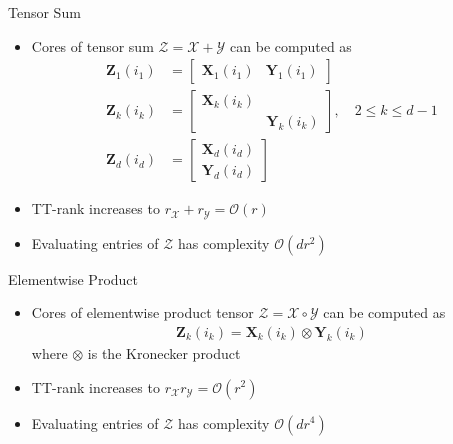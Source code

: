 \documentclass[aspectratio=169]{beamer}
\newcommand{\Mat}[1]{\mathbf{#1}}
\newcommand{\Tns}[1]{\mathcal{#1}}
\newcommand{\Ord}{\mathcal{O}}
\begin{document}
\begin{frame}{Tensor Sum}
  \begin{itemize}
    \item
      Cores of tensor sum $\Tns{Z} = \Tns{X} + \Tns{Y}$ can be computed as
      \begin{align*}
        \Mat{Z}_1(i_1) &=
        \begin{bmatrix}
          \Mat{X}_1(i_1) & \Mat{Y}_1(i_1)
        \end{bmatrix} \\
        \Mat{Z}_k(i_k) &=
        \begin{bmatrix}
          \Mat{X}_k(i_k) & \\
                         & \Mat{Y}_k(i_k)
        \end{bmatrix}, \quad 2 \leq k \leq d - 1 \\
        \Mat{Z}_d(i_d) &=
        \begin{bmatrix}
          \Mat{X}_d(i_d) \\
          \Mat{Y}_d(i_d)
        \end{bmatrix}
      \end{align*}
    \item
      TT-rank increases to $r_{\Tns{X}} + r_{\Tns{Y}} = \Ord(r)$
    \item
      Evaluating entries of $\Tns{Z}$ has complexity $\Ord(d r^2)$
  \end{itemize}
\end{frame}

\begin{frame}{Elementwise Product}
  \begin{itemize}
    \item
      Cores of elementwise product tensor $\Tns{Z} = \Tns{X} \circ \Tns{Y}$ can
      be computed as
      \begin{align*}
        \Mat{Z}_k(i_k) = \Mat{X}_k(i_k) \otimes \Mat{Y}_k(i_k)
      \end{align*}
      where $\otimes$ is the Kronecker product
    \item
      TT-rank increases to $r_{\Tns{X}} r_{\Tns{Y}} = \Ord(r^2)$
    \item
      Evaluating entries of $\Tns{Z}$ has complexity $\Ord(d r^4)$
  \end{itemize}
\end{frame}
\end{document}
